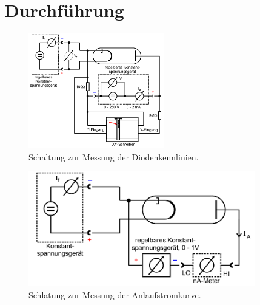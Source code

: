 \section{Durchführung}
\label{sec:Durchführung}
\begin{figure}
  \centering
  \includegraphics[height=5cm]{logos/Schaltung-Diodenkennlinie.png}
  \caption{Schaltung zur Messung der Diodenkennlinien.}
  \label{fig:SDL}
\end{figure}
\begin{figure}
  \includegraphics[height=5cm]{logos/Schaltung-Anlaufstromkurve.png}
  \caption{Schlatung zur Messung der Anlaufstromkurve.}
  \label{fig:SAK}
\end{figure}
